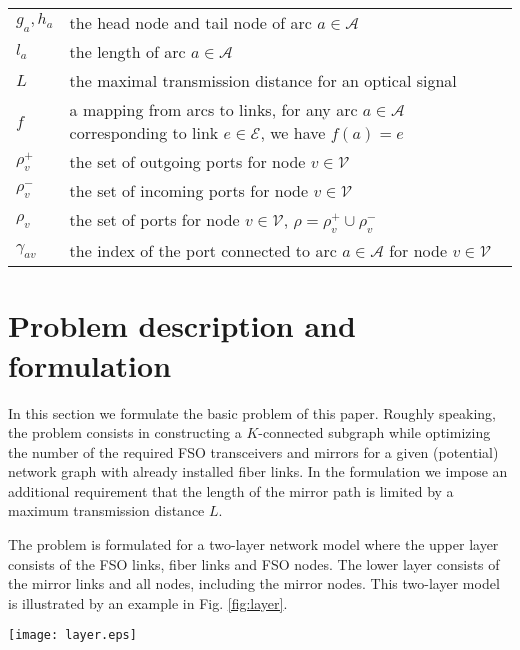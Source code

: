 \documentclass[onecolumn,11pt,draftclsnofoot]{IEEEtran}
\begin{document}
\begin{table}
\begin{tabular}{lp{16cm}}
$g_a,h_a$ & the head node and tail node of arc $a \in \mathcal A$\\
$l_a$ & the length of arc $a \in \mathcal A$\\
$L$ & the maximal transmission distance for an optical signal\\
$f$ & a mapping from arcs to links, for any arc $a \in \mathcal A$ corresponding to link $e \in \mathcal E$, we have $f(a)=e$\\
$\rho^+_{v}$ &  the set of outgoing ports for node $v \in \mathcal V$\\
$\rho^-_{v}$ & the set of incoming ports for node $v \in \mathcal V$\\
$\rho_{v}$ & the set of ports for node $v \in \mathcal V$, $\rho = \rho^+_{v} \cup \rho^-_{v}$\\
$\gamma_{av}$ & the index of the port connected to arc $a \in \mathcal A$ for node $v \in \mathcal V$\\
\hline
\end{tabular}
\hfill
\end{table}

\section{Problem description and formulation}\label{sec:formulation}
In this section we formulate the basic problem of this paper. Roughly speaking, the problem consists in constructing a $K$-connected subgraph while optimizing the number of the required FSO transceivers and mirrors for a given (potential) network graph with already installed fiber links. In the formulation we impose an additional requirement that the length of the mirror path is limited by a maximum transmission distance $L$.

The problem is formulated for a two-layer network model where the upper layer consists of the FSO links, fiber links and FSO nodes. The lower layer consists of the mirror links and all nodes, including the mirror nodes. This two-layer model is illustrated by an example in Fig. \ref{fig:layer}.

\begin{figure*}[!htbp]
\centering
\texttt{[image: layer.eps]}
\caption{An illustration of two layers for a graph}
\label{fig:layer}
\end{figure*}
\end{document}
